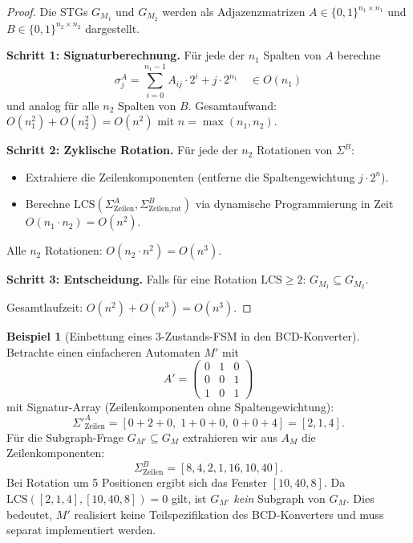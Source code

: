 ﻿\documentclass[a4paper,12pt]{article}
\theoremstyle{definition}
\newtheorem{beispiel}{Beispiel}
\begin{document}
\begin{proof}
  Die STGs $G_{M_1}$ und $G_{M_2}$ werden als Adjazenzmatrizen $A \in \{0,1\}^{n_1 \times n_1}$
  und $B \in \{0,1\}^{n_2 \times n_2}$ dargestellt.

  \textbf{Schritt 1: Signaturberechnung.}
  Für jede der $n_1$ Spalten von $A$ berechne
  \[
    \sigma_j^A = \sum_{i=0}^{n_1-1} A_{ij} \cdot 2^i + j \cdot 2^{n_1}
    \quad \in O(n_1)
  \]
  und analog für alle $n_2$ Spalten von $B$. Gesamtaufwand: $O(n_1^2) + O(n_2^2) = O(n^2)$
  mit $n = \max(n_1, n_2)$.

  \textbf{Schritt 2: Zyklische Rotation.}
  Für jede der $n_2$ Rotationen von $\Sigma^B$:
  \begin{itemize}
    \item Extrahiere die Zeilenkomponenten (entferne die Spaltengewichtung $j \cdot 2^n$).
    \item Berechne $\text{LCS}(\Sigma^A_{\text{Zeilen}}, \Sigma^B_{\text{Zeilen,rot}})$ via
          dynamische Programmierung in Zeit $O(n_1 \cdot n_2) = O(n^2)$.
  \end{itemize}
  Alle $n_2$ Rotationen: $O(n_2 \cdot n^2) = O(n^3)$.

  \textbf{Schritt 3: Entscheidung.}
  Falls für eine Rotation $\text{LCS} \geq 2$: $G_{M_1} \subseteq G_{M_2}$.

  Gesamtlaufzeit: $O(n^2) + O(n^3) = O(n^3)$.
\end{proof}

\begin{beispiel}[Einbettung eines 3-Zustands-FSM in den BCD-Konverter]\label{bsp:fsm}
  Betrachte einen einfacheren Automaten $M'$ mit
  \[
    A' = \begin{pmatrix} 0 & 1 & 0 \\ 0 & 0 & 1 \\ 1 & 0 & 1 \end{pmatrix}
  \]
  mit Signatur-Array (Zeilenkomponenten ohne Spaltengewichtung):
  \[
    \Sigma'^{A}_{\text{Zeilen}} = [0+2+0,\; 1+0+0,\; 0+0+4] = [2, 1, 4].
  \]
  Für die Subgraph-Frage $G_{M'} \subseteq G_M$ extrahieren wir aus $A_M$ die
  Zeilenkomponenten:
  \[
    \Sigma^B_{\text{Zeilen}} = [8, 4, 2, 1, 16, 10, 40].
  \]
  Bei Rotation um 5 Positionen ergibt sich das Fenster $[10, 40, 8]$. Da
  $\text{LCS}([2, 1, 4], [10, 40, 8]) = 0$ gilt, ist $G_{M'}$ \emph{kein} Subgraph
  von $G_M$. Dies bedeutet, $M'$ realisiert keine Teilspezifikation des BCD-Konverters
  und muss separat implementiert werden.
\end{beispiel}
\end{document}
